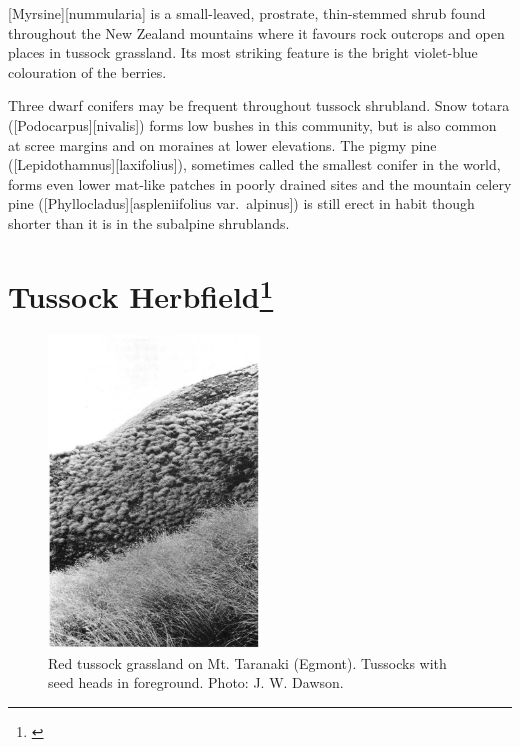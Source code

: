 [Myrsine][nummularia] is a small-leaved, prostrate, thin-stemmed shrub found throughout the New Zealand mountains where it favours rock outcrops and open places in tussock grassland.
Its most striking feature is the bright violet-blue colouration of the berries.

Three dwarf conifers may be frequent throughout tussock shrubland.
Snow totara ([Podocarpus][nivalis]) forms low bushes in this community, but is also common at scree margins and on moraines at lower elevations.
The pigmy pine ([Lepidothamnus][laxifolius]), sometimes called the smallest conifer in the world, forms even lower mat-like patches in poorly drained sites and the mountain celery pine ([Phyllocladus][aspleniifolius var.\ alpinus]) is still erect in habit though shorter than it is in the subalpine shrublands.

\section[Tussock Herbfield]{Tussock Herbfield\footnote{\cite{mark1980progress}}}

\begin{figure}
	\includegraphics[width=0.5\textwidth]{graphics/figure95red-tussock.jpg}
	\centering
	\caption[Red tussock grassland on Mt. Taranaki]{Red tussock grassland on Mt. Taranaki (Egmont).
	Tussocks with seed heads in foreground.
	Photo: J. W. Dawson.}%
	\label{fig:95red-tussock}
\end{figure}


